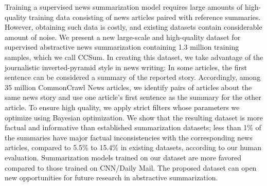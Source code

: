Training a supervised news summarization model requires large amounts of high-quality training data consisting of news articles paired with reference summaries. However, obtaining such data is costly, and existing datasets contain considerable amount of noise. We present a new large-scale and high-quality dataset for supervised abstractive news summarization containing 1.3 million training samples, which we call CCSum. In creating this dataset, we take advantage of the journalistic inverted-pyramid style in news writing: In some articles, the first sentence can be considered a summary of the reported story. Accordingly, among 35 million CommonCrawl News articles, we identify pairs of articles about the same news story and use one article's first sentence as the summary for the other article. To ensure high quality, we apply strict filters whose parameters we optimize using Bayesian optimization. We show that the resulting dataset is more factual and informative than established summarization datasets; less than 1\% of the summaries have major factual inconsistencies with the corresponding news articles, compared to 5.5\% to 15.4\% in existing datasets, according to our human evaluation. Summarization models trained on our dataset are more favored compared to those trained on CNN/Daily Mail. The proposed dataset can open new opportunities for future research in abstractive summarization.